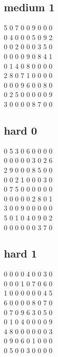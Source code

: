 \documentclass[11pt]{report}
\begin{document}
        \subsection{medium 1} \label{sec:mid1}
            5 0 7 0 0 9 0 0 0\\
            0 4 0 0 0 5 0 9 2\\
            0 0 2 0 0 0 3 5 0\\
            0 0 0 0 9 0 8 4 1\\
            0 1 4 0 8 0 0 0 0\\
            2 8 0 7 1 0 0 0 0\\
            0 0 0 9 6 0 0 8 0\\
            0 2 5 0 0 0 0 0 9\\
            3 0 0 0 0 8 7 0 0\\

       \subsection{hard 0} \label{sec:hard0}
            0 5 3 0 6 0 0 0 0\\
            0 0 0 0 0 3 0 2 6\\
            2 9 0 0 0 8 5 0 0\\
            0 0 2 1 0 0 0 3 0\\
            0 7 5 0 0 0 0 0 0\\
            0 0 0 0 0 2 8 0 1\\
            3 0 0 9 0 0 0 0 0\\
            5 0 1 0 4 0 9 0 2\\
            0 0 0 0 0 0 3 7 0\\

        \subsection{hard 1} \label{sec:hard1}    
            0 0 0 0 4 0 0 3 0\\
            0 0 0 1 0 7 0 6 0\\
            1 0 0 0 0 0 0 4 5\\
            6 0 0 0 0 8 0 7 0\\
            0 7 0 9 6 3 0 5 0\\
            0 1 0 4 0 0 0 0 9\\
            4 8 0 0 0 0 0 0 3\\
            0 9 0 6 0 1 0 0 0\\
            0 5 0 0 3 0 0 0 0\\
\end{document}
